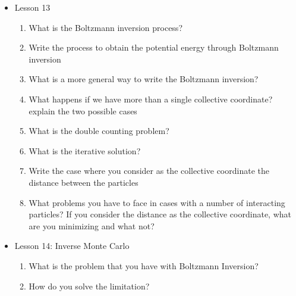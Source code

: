 {\begin{itemize}
\begin{enumerate}
        \item When and how does the mapping entropy change? By changing the mapping, in fact, the relative entropy can be consdiered as a distanceof two probability distributions that depend on mappign.
        \item What do you obtain by mapping in terms of relative entropy? a distance
        \item What formula of relative entropy do you obtain that should be minimized? (Gibbs-Bogoliubov inequality)
        \item What is the condition that is satisfied when you are at the minimum of the relative entropy? See the signed element
        \item What is also conserved in case in which the relative entropy is at the minimum? The radial distribution functions computed for the coarse grained and the all atom system.
        \item Make the straightforward conclusion.
    \end{enumerate}
    \item Lesson 13
    \begin{enumerate}
        \item What is the Boltzmann inversion process?
        \item Write the process to obtain the potential energy through Boltzmann inversion
        \item What is a more general way to write the Boltzmann inversion?
        \item What happens if we have more  than a single collective coordinate? explain the two possible cases
        \item What is the double counting problem?
        \item What is the iterative solution?
        \item Write the case where you consider as the collective coordinate the distance between the particles
        \item What problems you have to face in cases with a number of interacting particles? If you consider the distance as the collective coordinate, what are you minimizing and what not?
    \end{enumerate}
    \item Lesson 14: Inverse Monte Carlo
    \begin{enumerate}
        \item What is the problem that you have with Boltzmann Inversion?
        \item How do you solve the limitation?

\end{enumerate}
\end{itemize}}
